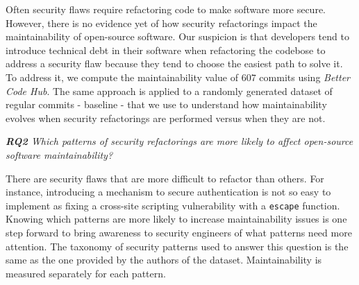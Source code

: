 \documentclass[10pt,conference]{IEEEtran}
\begin{document}
Often security flaws require refactoring code to make software more secure.
However, there is no evidence yet of how security refactorings impact the
maintainability of open-source software. Our suspicion is that developers tend
to introduce technical debt in their software when refactoring the codebose to
address a security flaw because they tend to choose the easiest path to solve
it. To address it, we compute the maintainability value of $607$ commits using
\emph{Better Code Hub}. The same approach is applied to a randomly generated
dataset of regular commits - baseline - that we use to understand how
maintainability evolves when security refactorings are performed versus when
they are not.

\begin{framed}
\textit{\textbf{RQ2} Which patterns of security refactorings are more likely to
affect open-source software maintainability?}
\end{framed}

There are security flaws that are more difficult to refactor than others. For
instance, introducing a mechanism to secure authentication is not so easy to
implement as fixing a cross-site scripting vulnerability with a \texttt{escape}
function. Knowing which patterns are more likely to increase maintainability
issues is one step forward to bring awareness to security engineers of what
patterns need more attention. The taxonomy of security patterns used to answer
this question is the same as the one provided by the authors of the dataset.
Maintainability is measured separately for each pattern.
%
\end{document}
